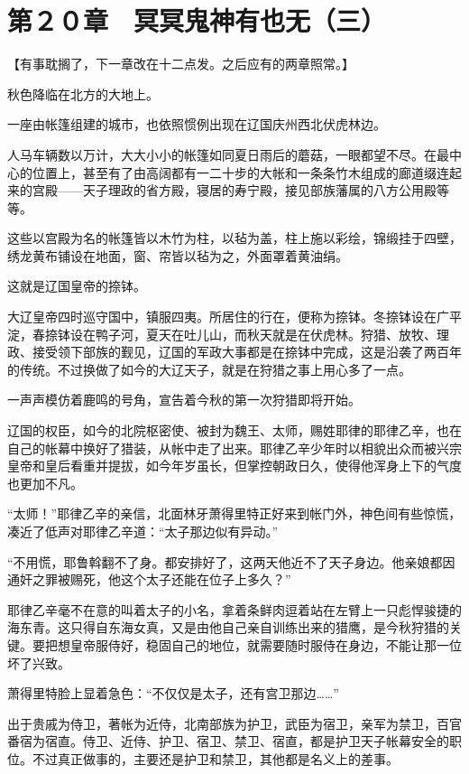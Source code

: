 \section{第２０章　冥冥鬼神有也无（三）}

【有事耽搁了，下一章改在十二点发。之后应有的两章照常。】

秋色降临在北方的大地上。

一座由帐篷组建的城市，也依照惯例出现在辽国庆州西北伏虎林边。

人马车辆数以万计，大大小小的帐篷如同夏日雨后的蘑菇，一眼都望不尽。在最中心的位置上，甚至有了由高阔都有一二十步的大帐和一条条竹木组成的廊道缀连起来的宫殿——天子理政的省方殿，寝居的寿宁殿，接见部族藩属的八方公用殿等等。

这些以宫殿为名的帐篷皆以木竹为柱，以毡为盖，柱上施以彩绘，锦缎挂于四壁，绣龙黄布铺设在地面，窗、帘皆以毡为之，外面罩着黄油绢。

这就是辽国皇帝的捺钵。

大辽皇帝四时巡守国中，镇服四夷。所居住的行在，便称为捺钵。冬捺钵设在广平淀，春捺钵设在鸭子河，夏天在吐儿山，而秋天就是在伏虎林。狩猎、放牧、理政、接受领下部族的觐见，辽国的军政大事都是在捺钵中完成，这是沿袭了两百年的传统。不过换做了如今的大辽天子，就是在狩猎之事上用心多了一点。

一声声模仿着鹿鸣的号角，宣告着今秋的第一次狩猎即将开始。

辽国的权臣，如今的北院枢密使、被封为魏王、太师，赐姓耶律的耶律乙辛，也在自己的帐幕中换好了猎装，从帐中走了出来。耶律乙辛少年时以相貌出众而被兴宗皇帝和皇后看重并提拔，如今年岁虽长，但掌控朝政日久，使得他浑身上下的气度也更加不凡。

“太师！”耶律乙辛的亲信，北面林牙萧得里特正好来到帐门外，神色间有些惊慌，凑近了低声对耶律乙辛道：“太子那边似有异动。”

“不用慌，耶鲁斡翻不了身。都安排好了，这两天他近不了天子身边。他亲娘都因通奸之罪被赐死，他这个太子还能在位子上多久？”

耶律乙辛毫不在意的叫着太子的小名，拿着条鲜肉逗着站在左臂上一只彪悍骏捷的海东青。这只得自东海女真，又是由他自己亲自训练出来的猎鹰，是今秋狩猎的关键。要把想皇帝服侍好，稳固自己的地位，就需要随时服侍在身边，不能让那一位坏了兴致。

萧得里特脸上显着急色：“不仅仅是太子，还有宫卫那边……”

出于贵戚为侍卫，著帐为近侍，北南部族为护卫，武臣为宿卫，亲军为禁卫，百官番宿为宿直。侍卫、近侍、护卫、宿卫、禁卫、宿直，都是护卫天子帐幕安全的职位。不过真正做事的，主要还是护卫和禁卫，其他都是名义上的差事。

